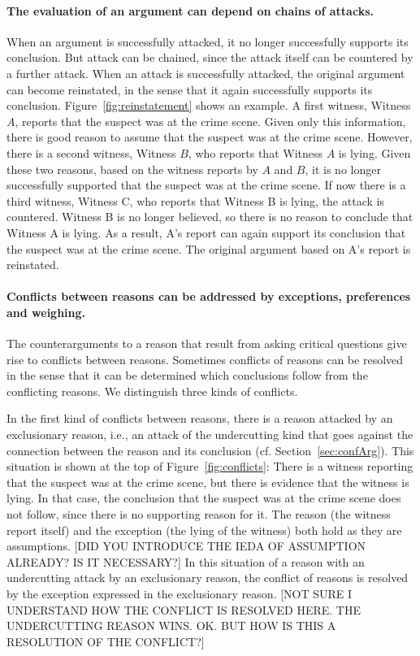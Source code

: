 \documentclass[10pt]{article}
\begin{document}
\paragraph{The evaluation of an argument can depend on chains of attacks.} When an argument is successfully attacked, it no longer successfully supports its conclusion. But attack can be chained, since the attack itself can be countered by a further attack. When an attack is successfully attacked, the original argument can become reinstated, in the sense that it again successfully supports its conclusion. Figure~\ref{fig:reinstatement} shows an example. A first witness, Witness $A$, reports that the suspect was at the crime scene. Given only this information, there is good reason to assume that the suspect was at the crime scene. However, there is a second witness, Witness $B$, who reports that Witness $A$ is lying. Given these two reasons, based on the witness reports by $A$ and $B$, it is no longer successfully supported that the suspect was at the crime scene. If now there is a third witness, Witness C, who reports that Witness B is lying, the attack is countered. Witness B is no longer believed, so there is no reason to conclude that Witness A is lying. As a result, A's report can again support its conclusion that the suspect was at the crime scene. The original argument based on A's report is reinstated. 

\paragraph{Conflicts between reasons can be addressed by exceptions, preferences and weighing.} The counterarguments to a reason that result from asking critical questions give rise to conflicts between reasons. Sometimes conflicts of reasons can be resolved in the sense that it can be determined which conclusions follow from the conflicting reasons. We distinguish three kinds of conflicts. 

In the first kind of conflicts between reasons, there is a reason attacked by an exclusionary reason, i.e., an attack of the undercutting kind that goes against the connection between the reason and its conclusion (cf. Section~\ref{sec:confArg}). This situation is shown at the top of Figure~\ref{fig:conflicts}: There is a witness reporting that the suspect was at the crime scene, but there is evidence that the witness is lying. 
In that case, the conclusion that the suspect was at the crime scene does not follow, since there is no supporting reason for it. The reason (the witness report itself) and the exception (the lying of the witness) both hold as they are assumptions. [DID YOU INTRODUCE THE IEDA OF ASSUMPTION ALREADY? IS IT NECESSARY?] In this situation of a reason with an undercutting attack by an exclusionary reason, the conflict of reasons is resolved by the exception expressed in the exclusionary reason. [NOT SURE I UNDERSTAND HOW THE CONFLICT IS RESOLVED HERE. THE UNDERCUTTING REASON WINS. OK. BUT HOW IS THIS A RESOLUTION OF THE CONFLICT?]
\end{document}
